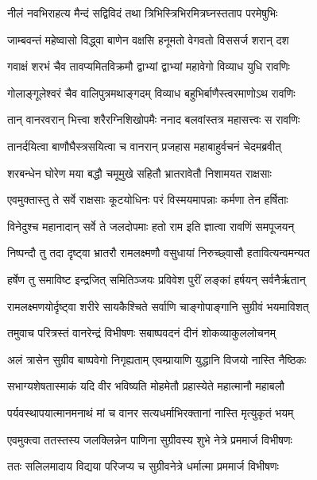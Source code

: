 \twolineshloka
{नीलं नवभिराहत्य मैन्दं सद्विविदं तथा}
{त्रिभिस्त्रिभिरमित्रघ्नस्तताप परमेषुभिः} %

\twolineshloka
{जाम्बवन्तं महेष्वासो विद्ध्वा बाणेन वक्षसि}
{हनूमतो वेगवतो विससर्ज शरान् दश} %

\twolineshloka
{गवाक्षं शरभं चैव तावप्यमितविक्रमौ}
{द्वाभ्यां द्वाभ्यां महावेगो विव्याध युधि रावणिः} %

\twolineshloka
{गोलाङ्गूलेश्वरं चैव वालिपुत्रमथाङ्गदम्}
{विव्याध बहुभिर्बाणैस्त्वरमाणोऽथ रावणिः} %

\twolineshloka
{तान् वानरवरान् भित्त्वा शरैरग्निशिखोपमैः}
{ननाद बलवांस्तत्र महासत्त्वः स रावणिः} %

\twolineshloka
{तानर्दयित्वा बाणौघैस्त्रसयित्वा च वानरान्}
{प्रजहास महाबाहुर्वचनं चेदमब्रवीत्} %

\twolineshloka
{शरबन्धेन घोरेण मया बद्धौ चमूमुखे}
{सहितौ भ्रातरावेतौ निशामयत राक्षसाः} %

\twolineshloka
{एवमुक्तास्तु ते सर्वे राक्षसाः कूटयोधिनः}
{परं विस्मयमापन्नाः कर्मणा तेन हर्षिताः} %

\twolineshloka
{विनेदुश्च महानादान् सर्वे ते जलदोपमाः}
{हतो राम इति ज्ञात्वा रावणिं समपूजयन्} %

\twolineshloka
{निष्पन्दौ तु तदा दृष्ट्वा भ्रातरौ रामलक्ष्मणौ}
{वसुधायां निरुच्छ्वासौ हतावित्यन्वमन्यत} %

\twolineshloka
{हर्षेण तु समाविष्ट इन्द्रजित् समितिञ्जयः}
{प्रविवेश पुरीं लङ्कां हर्षयन् सर्वनैर्ऋतान्} %

\twolineshloka
{रामलक्ष्मणयोर्दृष्ट्वा शरीरे सायकैश्चिते}
{सर्वाणि चाङ्गोपाङ्गानि सुग्रीवं भयमाविशत्} %

\twolineshloka
{तमुवाच परित्रस्तं वानरेन्द्रं विभीषणः}
{सबाष्पवदनं दीनं शोकव्याकुललोचनम्} %

\twolineshloka
{अलं त्रासेन सुग्रीव बाष्पवेगो निगृह्यताम्}
{एवम्प्रायाणि युद्धानि विजयो नास्ति नैष्ठिकः} %

\twolineshloka
{सभाग्यशेषतास्माकं यदि वीर भविष्यति}
{मोहमेतौ प्रहास्येते महात्मानौ महाबलौ} %

\twolineshloka
{पर्यवस्थापयात्मानमनाथं मां च वानर}
{सत्यधर्माभिरक्तानां नास्ति मृत्युकृतं भयम्} %

\twolineshloka
{एवमुक्त्वा ततस्तस्य जलक्लिन्नेन पाणिना}
{सुग्रीवस्य शुभे नेत्रे प्रममार्ज विभीषणः} %

\twolineshloka
{ततः सलिलमादाय विद्यया परिजप्य च}
{सुग्रीवनेत्रे धर्मात्मा प्रममार्ज विभीषणः} %

